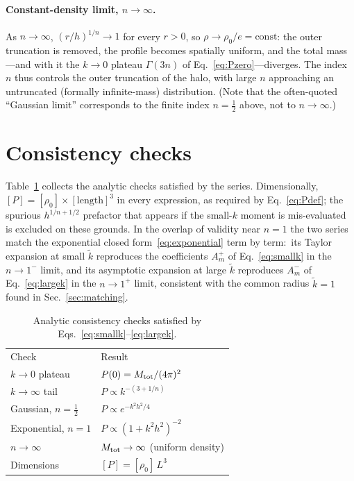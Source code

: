 \documentclass[aps,prd,onecolumn]{revtex4-2}
\newcommand{\kt}{\tilde{k}}          %
\begin{document}
\paragraph*{Constant-density limit, $n\to\infty$.}
As $n\to\infty$, $(r/h)^{1/n}\to1$ for every $r>0$, so
$\rho\to\rho_0/e=\text{const}$: the outer truncation is removed, the
profile becomes spatially uniform, and the total mass---and with it the
$k\to0$ plateau $\Gamma(3n)$ of Eq.~\eqref{eq:Pzero}---diverges.  The index
$n$ thus controls the outer truncation of the halo, with large $n$
approaching an untruncated (formally infinite-mass) distribution.  (Note
that the often-quoted ``Gaussian limit'' corresponds to the finite index
$n=\tfrac12$ above, not to $n\to\infty$.)

\section{Consistency checks}
\label{sec:checks}

Table~\ref{tab:checks} collects the analytic checks satisfied by the
series.  Dimensionally, $[P]=[\rho_0]\times[\text{length}]^3$ in every
expression, as required by Eq.~\eqref{eq:Pdef}; the spurious
$h^{1/n+1/2}$ prefactor that appears if the small-$k$ moment is
mis-evaluated is excluded on these grounds.  In the overlap of validity
near $n=1$ the two series match the exponential closed
form~\eqref{eq:exponential} term by term:\ its Taylor expansion at small
$\kt$ reproduces the coefficients $A_m^{+}$ of Eq.~\eqref{eq:smallk} in the
$n\to1^-$ limit, and its asymptotic expansion at large $\kt$ reproduces
$A_m^{-}$ of Eq.~\eqref{eq:largek} in the $n\to1^+$ limit, consistent with
the common radius $\kt=1$ found in Sec.~\ref{sec:matching}.

\begin{table}[t]
\caption{Analytic consistency checks satisfied by
Eqs.~\eqref{eq:smallk}--\eqref{eq:largek}.}
\label{tab:checks}
\begin{ruledtabular}
\begin{tabular}{ll}
Check & Result\\
\colrule
$k\to0$ plateau        & $P(0)=M_{\rm tot}/(4\pi)^2$ \\
$k\to\infty$ tail      & $P\propto k^{-(3+1/n)}$ \\
Gaussian, $n=\tfrac12$ & $P\propto e^{-k^2h^2/4}$ \\
Exponential, $n=1$     & $P\propto(1+k^2h^2)^{-2}$ \\
$n\to\infty$           & $M_{\rm tot}\to\infty$ (uniform density)\\
Dimensions             & $[P]=[\rho_0]\,L^3$ \\
\end{tabular}
\end{ruledtabular}
\end{table}
\end{document}
